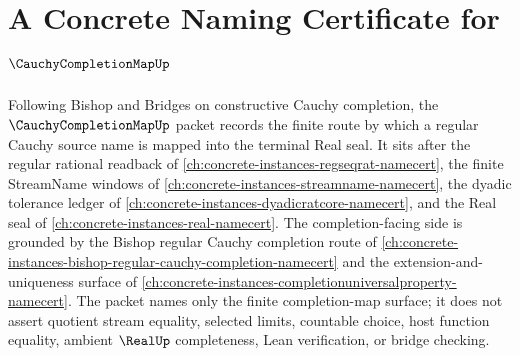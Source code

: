 \chapter{A Concrete Naming Certificate for $\CauchyCompletionMapUp$}
\label{ch:concrete-instances-cauchy-completion-map-namecert}

Following Bishop and Bridges on constructive Cauchy completion, the $\CauchyCompletionMapUp$ packet records the finite route by which a regular Cauchy source name is mapped into the terminal Real seal. It sits after the regular rational readback of \autoref{ch:concrete-instances-regseqrat-namecert}, the finite StreamName windows of \autoref{ch:concrete-instances-streamname-namecert}, the dyadic tolerance ledger of \autoref{ch:concrete-instances-dyadicratcore-namecert}, and the Real seal of \autoref{ch:concrete-instances-real-namecert}. The completion-facing side is grounded by the Bishop regular Cauchy completion route of \autoref{ch:concrete-instances-bishop-regular-cauchy-completion-namecert} and the extension-and-uniqueness surface of \autoref{ch:concrete-instances-completionuniversalproperty-namecert}. The packet names only the finite completion-map surface; it does not assert quotient stream equality, selected limits, countable choice, host function equality, ambient $\RealUp$ completeness, Lean verification, or bridge checking.

